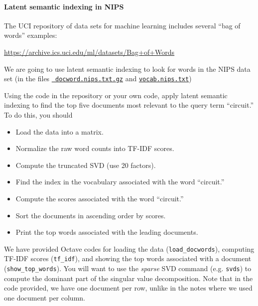 \documentclass[12pt, leqno]{article} %
\begin{document}

\paragraph*{Latent semantic indexing in NIPS}
The UCI repository of data sets for machine learning includes several
``bag of words'' examples:
\begin{center}
  \url{https://archive.ics.uci.edu/ml/datasets/Bag+of+Words}
\end{center}
We are going to use latent semantic indexing to look for words in the
NIPS data set (in the files
\href{https://archive.ics.uci.edu/ml/machine-learning-databases/bag-of-words/docword.nips.txt.gz}{\tt
  docword.nips.txt.gz} and
\href{https://archive.ics.uci.edu/ml/machine-learning-databases/bag-of-words/vocab.nips.txt}{\tt vocab.nips.txt})

Using the code in the repository or your own code, apply latent
semantic indexing to find the top five documents most relevant to the
query term ``circuit.''  To do this, you should
\begin{itemize}
\item Load the data into a matrix.
\item Normalize the raw word counts into TF-IDF scores.
\item Compute the truncated SVD (use 20 factors).
\item Find the index in the vocabulary associated with the word ``circuit.''
\item Compute the scores associated with the word ``circuit.''
\item Sort the documents in ascending order by scores.
\item Print the top words associated with the leading documents.
\end{itemize}
We have provided Octave codes for loading the data ({\tt load\_docwords}),
computing TF-IDF scores ({\tt tf\_idf}), and showing the top words
associated with a document ({\tt show\_top\_words}).  You will want
to use the {\em sparse} SVD command (e.g. {\tt svds}) to compute the
dominant part of the singular value decomposition.  Note that in the
code provided, we have one document per row, unlike in the notes where
we used one document per column.
\end{document}
